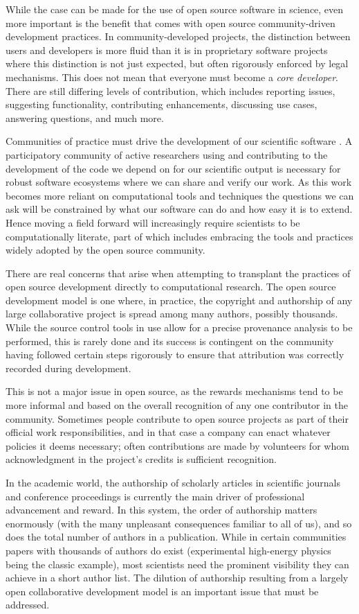 \documentclass[11pt,oneside,english]{article}
\begin{document}
While the case can be made for the use of open source software in science, even
more important is the benefit that comes with open source community-driven
development practices.  In community-developed projects, the distinction
between users and developers is more fluid than it is in proprietary software
projects where this distinction is not just expected, but often rigorously
enforced by legal mechanisms. This does not mean that everyone must become a
\emph{core developer}. There are still differing levels of contribution, which
includes reporting issues, suggesting functionality, contributing
enhancements, discussing use cases, answering questions, and much more.

Communities of practice must drive the development of our scientific software
\cite{turk2013scale}. A participatory community of active researchers using and
contributing to the development of the code we depend on for our scientific
output is necessary for robust software ecosystems where we can share and
verify our work. As this work becomes more reliant on computational tools and
techniques the questions we can ask will be constrained by what our software
can do and how easy it is to extend. Hence moving a field forward will
increasingly require scientists to be computationally literate, part of
which includes embracing the tools and practices widely adopted by the open
source community.

There are real concerns that arise when attempting to transplant the practices
of open source development directly to computational research. The open source
development model is one where, in practice, the copyright and authorship of
any large collaborative project is spread among many authors, possibly
thousands.  While the source control tools in use allow for a
precise provenance analysis to be performed, this is rarely done and
its success is contingent on the community having followed certain steps
rigorously to ensure that attribution was correctly recorded during
development.

This is not a major issue in open source, as the rewards mechanisms tend to be
more informal and based on the overall recognition of any one contributor in
the community. Sometimes people contribute to open source projects as part of
their official work responsibilities, and in that case a company can enact
whatever policies it deems necessary; often contributions are made by
volunteers for whom acknowledgment in the project's credits is sufficient
recognition.

In the academic world, the authorship of scholarly articles in scientific
journals and conference proceedings is currently the main driver of
professional advancement and reward. In this system, the order of authorship
matters enormously (with the many unpleasant consequences familiar to all of
us), and so does the total number of authors in a publication. While in certain
communities papers with thousands of authors do exist (experimental high-energy
physics being the classic example), most scientists need the prominent
visibility they can achieve in a short author list. The dilution of authorship
resulting from a largely open collaborative development model is an important
issue that must be addressed.
\end{document}
